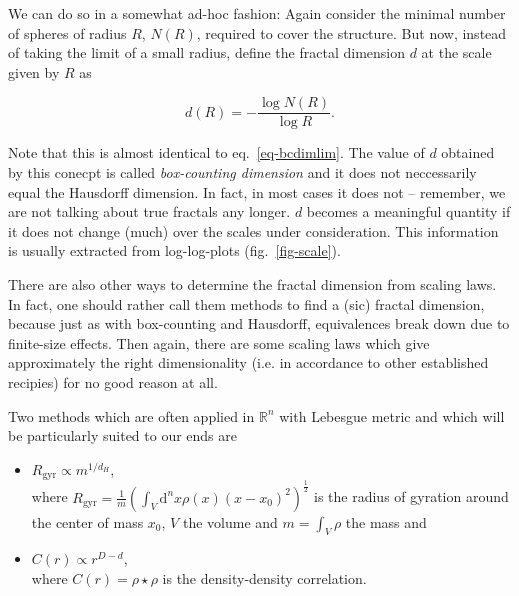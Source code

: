 \documentclass[twocolumn,10pt]{scrartcl}
\begin{document}
            We can do so in a somewhat ad-hoc fashion: Again consider the minimal number of spheres of radius $R$,
            $N(R)$, required to cover the structure. But now, instead of taking the limit of a small radius, define the
            fractal dimension $d$ at the scale given by $R$ as

            \begin{equation}
                d(R)=-\frac{\log N(R)}{\log R}.
                \label{eq-bcdim}
            \end{equation}

            Note that this is almost identical to eq.~\ref{eq-bcdimlim}. 
            The value of $d$ obtained by this conecpt is called \emph{box-counting dimension} and it does not
            neccessarily equal the Hausdorff dimension. In fact, in most cases it does not -- remember, we are not
            talking about true fractals any longer. $d$ becomes a meaningful quantity if it does
            not change (much) over the scales under consideration. This information is usually extracted from
            log-log-plots (fig.~\ref{fig-scale}).

            There are also other ways to determine the fractal dimension from scaling laws. In fact, one should rather
            call them methods to find a (sic) fractal dimension, because just as with box-counting and Hausdorff,
            equivalences break down due to finite-size effects. Then again, there are some scaling laws which give
            approximately the right dimensionality (i.e. in accordance to other established recipies) for no good
            reason at all.
            
            Two methods which are often applied in $\mathbb{R}^n$ with Lebesgue metric and which will be particularly
            suited to our ends are
            \begin{itemize}
                \item $R_\mathrm{gyr}\propto m^{1/d_H}$,\\where $R_\mathrm{gyr}=\frac{1}{m}\left(\int_V \mathrm{d}^n x
                    \rho\left(x\right)\left(x-x_0\right)^2\right)^\frac{1}{2}$ is the radius of gyration around the
                    center of mass $x_0$, $V$ the volume and $m=\int_V \rho$ the mass and
                \item $C(r)\propto r^{D-d}$,\\where $C(r)=\rho\star\rho$ is the density-density correlation.
            \end{itemize}
\end{document}
